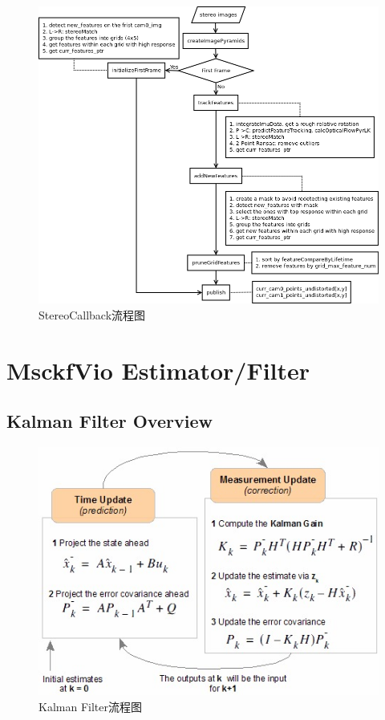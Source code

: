 \documentclass[12pt,a4paper]{article}
\begin{document}
\begin{figure}[!htbp]
\centering
\includegraphics[scale=0.6]{images/stereo_cb.png}
\caption{StereoCallback流程图}
\end{figure}


\newpage
\section{MsckfVio Estimator/Filter}

\subsection{Kalman Filter Overview}

\begin{figure}[!htbp]
\centering
\includegraphics[scale=0.7]{images/kf_flow.jpg}
\caption{Kalman Filter流程图}
\end{figure}
\end{document}
